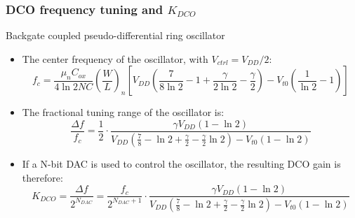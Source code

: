 \documentclass[t, screen, aspectratio=43]{beamer}
\begin{document}
\begin{frame}
	\frametitle{DCO frequency tuning and $K_{DCO}$}
	\begin{block}{Backgate coupled pseudo-differential ring oscillator}
		\begin{itemize}
			\scriptsize
			\item The center frequency of the oscillator, with $V_{ctrl}=V_{DD}/2$:
			\tiny
		\begin{equation}
			f_{c} = \frac{\mu_nC_{ox}}{4\ln2NC}\left(\frac{W}{L}\right)_n\left[V_{DD}\left(\frac{7}{8\ln2}-1+\frac{\gamma}{2\ln2}-\frac{\gamma}{2}\right)-V_{t0}\left(\frac{1}{\ln2}-1\right)\right]
		\end{equation}
			\scriptsize
			\item The fractional tuning range of the oscillator is:
			\tiny
	\begin{equation}
		\frac{\Delta f}{f_c} = \frac{1}{2}\cdot\frac{\gamma V_{DD}\left( 1-\ln2 \right)}{V_{DD}\left(\frac{7}{8}-\ln2+\frac{\gamma}{2}-\frac{\gamma}{2}\ln2\right)-V_{t0}\left(1-\ln2\right)}
	\end{equation}	
			\scriptsize
			\item If a N-bit DAC is used to control the oscillator, the resulting DCO gain is therefore:
			\tiny
	\begin{equation}
		K_{DCO} = \frac{\Delta f}{2^{N_{DAC}}} = \frac{f_c}{2^{N_{DAC}+1}}\cdot\frac{\gamma V_{DD}\left( 1-\ln2 \right)}{V_{DD}\left(\frac{7}{8}-\ln2+\frac{\gamma}{2}-\frac{\gamma}{2}\ln2\right)-V_{t0}\left(1-\ln2\right)}
	\end{equation}	

		\end{itemize} 	
	\end{block}
\end{frame}
\end{document}
